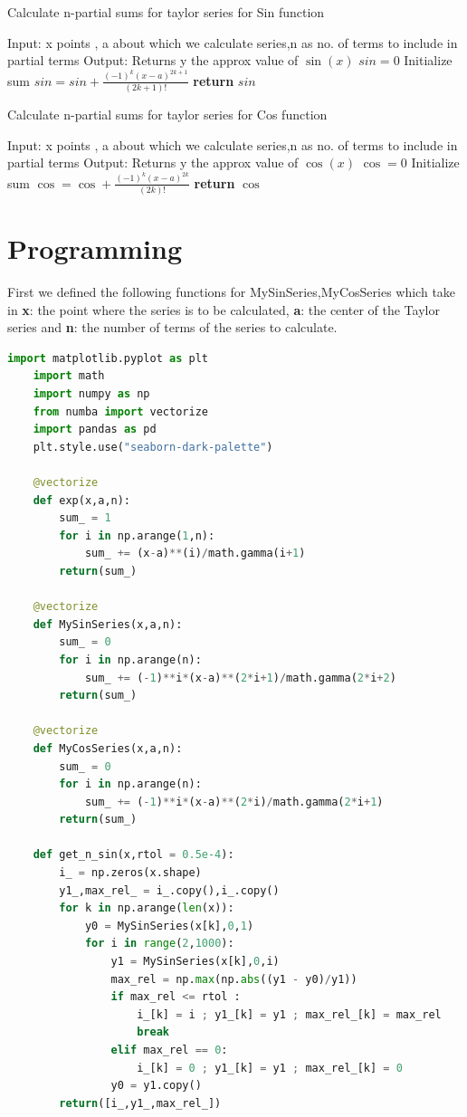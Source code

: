 \documentclass[12pt]{article}
\begin{document}
  
  \begin{algorithm}[H]
	\caption{Calculate n-partial sums for taylor series for Sin function }
	\begin{algorithmic}
	  \State Input: x points , a about which we calculate series,n as no. of terms to include in partial terms
	  \State Output: Returns y the approx value of $\sin(x)$ 
	  \State $sin = 0$
	  \Comment Initialize sum
		 \State $sin = sin + \frac{(-1)^{k}(x-a)^{2k+1}}{(2k+1)!}$
		 \EndFor 
		 \State \textbf{return} $sin$              
	  \EndProcedure
	\end{algorithmic} 
  \end{algorithm}
  
  \begin{algorithm}[H]
	\caption{Calculate n-partial sums for taylor series for Cos function}
	\begin{algorithmic}
	  \Procedure{Cosseries}{$x,a,n$}
	  \State Input: x points , a about which we calculate series,n as no. of terms to include in partial terms
	  \State Output: Returns y the approx value of $\cos(x)$ 
	  \State $\cos = 0$
	  \Comment Initialize sum
		\For{ $k = 0,1,2,3\dots n $}
		 \State $\cos = \cos + \frac{(-1)^{k}(x-a)^{2k}}{(2k)!}$
		 \EndFor 
		 \State \textbf{return} $\cos$              
	  \EndProcedure
	\end{algorithmic} 
  \end{algorithm}
  
  
\section{Programming}
First we defined the following functions for MySinSeries,MyCosSeries which take in \textbf{x}: the point where the series is to be calculated, \textbf{a}: the center of the Taylor series and \textbf{n}: the number of terms of the series to calculate.
\begin{lstlisting}[language=Python]
	import matplotlib.pyplot as plt
	import math
	import numpy as np
	from numba import vectorize
	import pandas as pd
	plt.style.use("seaborn-dark-palette")
	
	@vectorize
	def exp(x,a,n):
		sum_ = 1
		for i in np.arange(1,n):
			sum_ += (x-a)**(i)/math.gamma(i+1)
		return(sum_)

	@vectorize
	def MySinSeries(x,a,n):
		sum_ = 0
		for i in np.arange(n):
			sum_ += (-1)**i*(x-a)**(2*i+1)/math.gamma(2*i+2)
		return(sum_)

	@vectorize
	def MyCosSeries(x,a,n):
		sum_ = 0
		for i in np.arange(n):
			sum_ += (-1)**i*(x-a)**(2*i)/math.gamma(2*i+1)
		return(sum_)

	def get_n_sin(x,rtol = 0.5e-4):
		i_ = np.zeros(x.shape)
		y1_,max_rel_ = i_.copy(),i_.copy()
		for k in np.arange(len(x)):        
			y0 = MySinSeries(x[k],0,1)
			for i in range(2,1000):
				y1 = MySinSeries(x[k],0,i)
				max_rel = np.max(np.abs((y1 - y0)/y1))
				if max_rel <= rtol :
					i_[k] = i ; y1_[k] = y1 ; max_rel_[k] = max_rel
					break
				elif max_rel == 0:
					i_[k] = 0 ; y1_[k] = y1 ; max_rel_[k] = 0
				y0 = y1.copy()
		return([i_,y1_,max_rel_])
\end{lstlisting}
\end{document}
